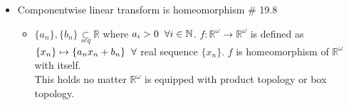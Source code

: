 \documentclass[12pt]{article}
\newcommand{\sptwo}{\hspace{0.2cm}}
\newcommand{\Nat}{\mathbb{N}}
\newcommand{\Real}{\mathbb{R}}
\newcommand{\seq}{\underset{seq}{\subset}}
\begin{document}
\begin{itemize}
\begin{itemize}
\begin{enumerate}
		\end{enumerate}
	\end{itemize}
	\item Componentwise linear transform is homeomorphism \quad \# 19.8
	\begin{itemize}
		\item $\{a_n\},\{b_n\}\seq \Real$ where $a_i>0 \sptwo \forall i\in \Nat$. $f: \Real^\omega \rightarrow \Real^\omega$ is defined as \\ $\{x_n\}\mapsto \{a_nx_n+b_n\} \sptwo \forall$ real sequence $\{x_n\}$. $f$ is homeomorphism of $\Real^\omega$ with itself. \\ This holds no matter $\Real^\omega$ is equipped with product topology or box topology.
	\end{itemize} 	
\end{itemize} 
\bigskip
\end{document}
